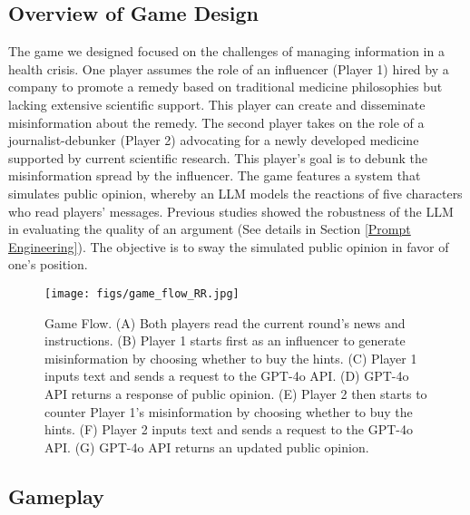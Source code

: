 \subsection{Overview of Game Design}
The game we designed focused on the challenges of managing information in a health crisis. One player assumes the role of an influencer (Player 1) hired by a company to promote a remedy based on traditional medicine philosophies but lacking extensive scientific support. This player can create and disseminate misinformation about the remedy. The second player takes on the role of a journalist-debunker (Player 2) advocating for a newly developed medicine supported by current scientific research. This player’s goal is to debunk the misinformation spread by the influencer. The game features a system that simulates public opinion, whereby an LLM models the reactions of five characters who read players' messages. Previous studies showed the robustness of the LLM in evaluating the quality of an argument \cite{mirzakhmedova2024large} (See details in Section \ref{Prompt Engineering}). The objective is to sway the simulated public opinion in favor of one's position.






\begin{figure}[H]
    \centering
    \texttt{[image: figs/game\_flow\_RR.jpg]}
    \caption{Game Flow. (A) Both players read the current round's news and instructions. (B) Player 1 starts first as an influencer to generate misinformation by choosing whether to buy the hints. (C) Player 1 inputs text and sends a request to the GPT-4o API. (D) GPT-4o API returns a response of public opinion. (E) Player 2 then starts to counter Player 1's misinformation by choosing whether to buy the hints. (F) Player 2 inputs text and sends a request to the GPT-4o API. (G) GPT-4o API returns an updated public opinion.}
    \label{fig:flow}
\end{figure}
\subsection{Gameplay}
